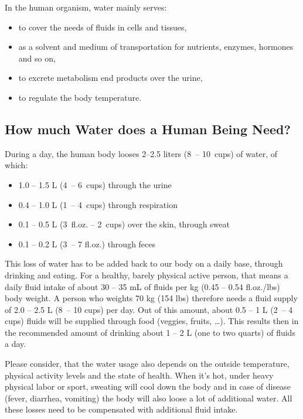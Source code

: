 \documentclass[../main.tex]{subfiles}
\begin{document}
In the human organism, water mainly serves:
\begin{itemize}
\item to cover the needs of fluids in cells and tissues,
\item as a solvent and medium of transportation for nutrients, enzymes, hormones and so on,
\item to excrete metabolism end products over the urine,
\item to regulate the body temperature.
\end{itemize}

\subsection{How much Water does a Human Being Need?}

During a day, the human body looses 2--2.5 liters (8\ -- 10\ cups) of water, of which:
\begin{itemize}
\item 1.0 -- 1.5 L (4\ -- 6\ cups) through the urine
\item 0.4 -- 1.0 L (1\ -- 4\ cups) through respiration
\item 0.1 -- 0.5 L (3\ fl.oz. -- 2\ cups) over the skin, through sweat
  \item 0.1 -- 0.2 L (3\ -- 7 fl.oz.) through feces
  \end{itemize}

  This loss of water has to be added back to our body on a daily base, through drinking and eating.
  For a healthy, barely physical active person, that means a daily fluid intake of about 30 -- 35 mL of fluids per kg (0.45 -- 0.54 fl.oz./lbs) body weight.
  A person who weights 70 kg (154 lbs) therefore needs a fluid supply of 2.0 -- 2.5 L (8\ -- 10 cups) per day.
  Out of this amount, about 0.5 -- 1 L (2\ -- 4 cups) fluids will be supplied through food (veggies, fruits, \ldots).
  This results then in the recommended amount of drinking about 1 -- 2 L (one to two quarts) of fluids a day.

  Please consider, that the water usage also depends on the outside temperature, physical activity levels and the state of health.
  When it's hot, under heavy physical labor or sport, sweating will cool down the body and
  in case of disease (fever, diarrhea, vomiting) the body will also loose a lot of additional water.
  All these losses need to be compensated with additional fluid intake.
\end{document}
